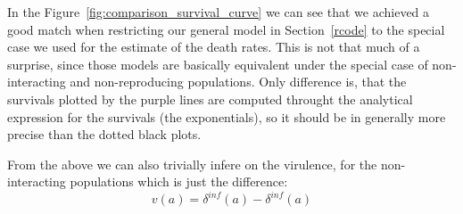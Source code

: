 \documentclass[10pt]{article}         %
\begin{document}
In the Figure~\ref{fig:comparison_survival_curve} we can see that we achieved a good match when restricting our general model in Section~\ref{rcode} to the special case we used for the estimate of the death rates. This is not that much of a surprise, since those models are basically equivalent under the special case of non-interacting and non-reproducing populations. Only difference is, that the survivals plotted by the purple lines are computed throught the analytical expression for the survivals (the exponentials), so it should be in generally more precise than the dotted black plots.

From the above we can also trivially infere on the virulence, for the non-interacting populations which is just the difference:
\begin{equation}
v(a) = \delta^{inf}(a) - \delta^{inf}(a)
\end{equation}



\end{document}
